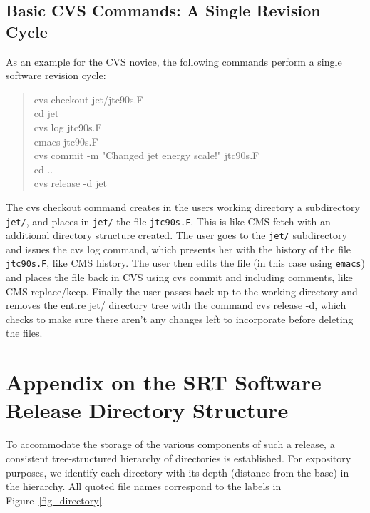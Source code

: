 \subsection{ Basic CVS Commands: A Single Revision Cycle}

As an example for the CVS novice, the following commands perform a single
software revision cycle:
\begin{quote}
\ttfamily
cvs checkout jet/jtc90s.F \\
cd jet \\
cvs log jtc90s.F \\
emacs jtc90s.F \\
cvs commit -m "Changed jet energy scale!" jtc90s.F \\
cd .. \\
cvs release -d jet \\
\end{quote}
The {\ttfamily cvs checkout} command creates in the users working directory a
subdirectory \texttt{jet/}, and places in \texttt{jet/} the file
\texttt{jtc90s.F}. This is like {\ttfamily CMS fetch} with an additional directory structure
created. The user goes to the \texttt{jet/} subdirectory and issues the
{\ttfamily cvs log} command, which presents her with the history of the file
\texttt{jtc90s.F}, like {\ttfamily CMS history}. The user then edits the file
(in this case using \texttt{emacs}) and places the file
back in CVS using {\ttfamily cvs commit} and including comments, like
{\ttfamily CMS replace/keep}.  Finally the user passes back up to the working
directory and removes the entire jet/ directory tree with the command
{\ttfamily cvs release -d}, which checks to make sure there aren't any changes  
left to incorporate before deleting the files.

\clearpage
\section{Appendix on the SRT Software Release Directory Structure}
\label{app_structure}

    To accommodate the storage of the various components of such a release, 
a consistent tree-structured hierarchy of directories is established. 
For expository purposes, we identify each directory with its depth (distance 
from the base) in the hierarchy. All quoted file names correspond to the 
labels in Figure~\ref{fig_directory}.

